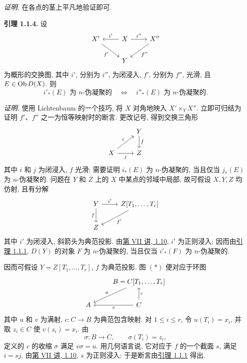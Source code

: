 \emph{证明.} 在各点的茎上平凡地验证即可.

\textbf{引理 1.1.4.} 设
\[
\begin{tikzcd}
X' \arrow[dr,"f'"'] & X \arrow[l,"i'"'] \arrow[r,"i''"] & X''\arrow[dl,"f''"]\\
& Y &
\end{tikzcd}
\]
为概形的交换图, 其中 \(i'\), 分别为 \(i''\), 为闭浸入, \(f'\), 分别为 \(f''\), 光滑, 且 \(E\in \operatorname{Ob} D(X)\). 则
\[
  i'_*(E)\text{ 为 }n\text{-伪凝聚的}
  \quad\Longleftrightarrow\quad
  i''_*(E)\text{ 为 }n\text{-伪凝聚的}.
\]

\emph{证明.} 使用 Lichtenbaum 的一个技巧, 将 \(X\) 对角地映入 \(X'\times_YX''\). 立即可归结为证明 \(f'\)、\(f''\) 之一为恒等映射时的断言. 更改记号, 得到交换三角形
\[
\begin{tikzcd}
& Y \arrow[d,"f"]\\
X \arrow[r,"j"'] \arrow[ur,"i"] & Z
\end{tikzcd}
\]
其中 \(i\) 和 \(j\) 为闭浸入, \(f\) 光滑; 需要证明 \(i_*(E)\) 为 \(n\)-伪凝聚的, 当且仅当 \(j_*(E)\) 为 \(n\)-伪凝聚的. 问题在 \(Y\) 和 \(Z\) 上的 \(X\) 中某点的邻域中局部, 故可假设 \(X,Y,Z\) 均仿射, 且有分解
\[
\begin{tikzcd}
Y \arrow[r,"i'"] \arrow[d,"f"'] & Z[T_1,\ldots,T_r]\arrow[dl,"f'"]\\
Z&
\end{tikzcd}
\]
其中 \(i'\) 为闭浸入, 斜箭头为典范投影. 由\hyperlink{sga6.e07.prop.1-10}{第 VII 讲, 1.10}, \(i'\) 为正则浸入; 因而由\hyperlink{sga6.e03.lem.1-1-1}{引理 1.1.1}, \(D(Y)\) 的对象 \(F\) 为 \(n\)-伪凝聚的, 当且仅当 \(i'_*(F)\) 为 \(n\)-伪凝聚的.

因而可假设 \(Y=Z[T_1,\ldots,T_r]\), \(f\) 为典范投影. 图 \((*)\) 便对应于环图
\[
\begin{tikzcd}
& B=C[T_1,\ldots,T_r]\arrow[dl,"u"']\\ A & C\arrow[l,"v"]\arrow[u,"c"']
\end{tikzcd}
\]
其中 \(u\) 和 \(v\) 为满射, \(c:C\to B\) 为典范包含映射. 对 \(1\leq i\leq r\), 令 \(u(T_i)=x_i\), 并取 \(z_i\in C\) 使 \(v(z_i)=x_i\). 由
\[
  \sigma:B\longrightarrow C,\qquad \sigma(T_i)=z_i,
\]
定义的 \(c\) 的收缩 \(\sigma\) 满足 \(v\sigma=u\). 用几何语言说, 它对应于 \(f\) 的一个截面 \(s\), 满足 \(i=sj\). 由\hyperlink{sga6.e07.prop.1-10}{第 VII 讲, 1.10}, \(s\) 为正则浸入; 于是断言由\hyperlink{sga6.e03.lem.1-1-1}{引理 1.1.1} 得出.

